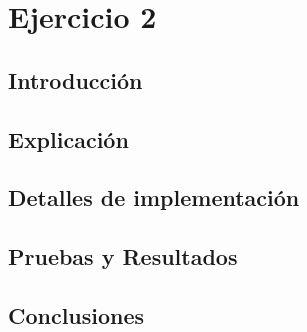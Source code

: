 \section {Ejercicio 2}
\subsection{Introducción}


\subsection{Explicación}


\subsection{Detalles de implementación}


\subsection{Pruebas y Resultados}


\subsection{Conclusiones}

